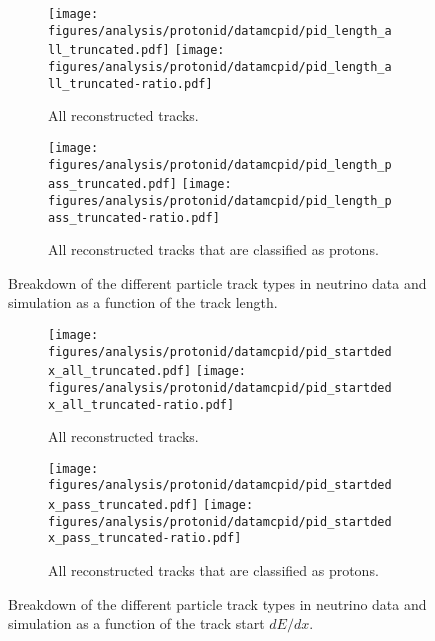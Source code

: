     \begin{figure}[h]
      \centering
      \begin{subfigure}[t]{2.5in}
        \texttt{[image: figures/analysis/protonid/datamcpid/pid\_length\_all\_truncated.pdf]}
        \texttt{[image: figures/analysis/protonid/datamcpid/pid\_length\_all\_truncated-ratio.pdf]}
        \caption{All reconstructed tracks.}
      \end{subfigure}
      \hspace{2pt}
      \begin{subfigure}[t]{2.5in}
        \texttt{[image: figures/analysis/protonid/datamcpid/pid\_length\_pass\_truncated.pdf]}
        \texttt{[image: figures/analysis/protonid/datamcpid/pid\_length\_pass\_truncated-ratio.pdf]}
        \caption{All reconstructed tracks that are classified as protons.}
      \end{subfigure}
      \caption{Breakdown of the different particle track types in neutrino data
      and simulation as a function of the track length.}
      \label{fig:pidlength}
    \end{figure}
    \begin{figure}[h]
      \centering
      \begin{subfigure}[t]{2.5in}
        \texttt{[image: figures/analysis/protonid/datamcpid/pid\_startdedx\_all\_truncated.pdf]}
        \texttt{[image: figures/analysis/protonid/datamcpid/pid\_startdedx\_all\_truncated-ratio.pdf]}
        \caption{All reconstructed tracks.}
      \end{subfigure}
      \hspace{2pt}
      \begin{subfigure}[t]{2.5in}
        \texttt{[image: figures/analysis/protonid/datamcpid/pid\_startdedx\_pass\_truncated.pdf]}
        \texttt{[image: figures/analysis/protonid/datamcpid/pid\_startdedx\_pass\_truncated-ratio.pdf]}
        \caption{All reconstructed tracks that are classified as protons.}
      \end{subfigure}
      \caption{Breakdown of the different particle track types in neutrino data
      and simulation as a function of the track start $dE/dx$.}
      \label{fig:piddedx}
    \end{figure}
